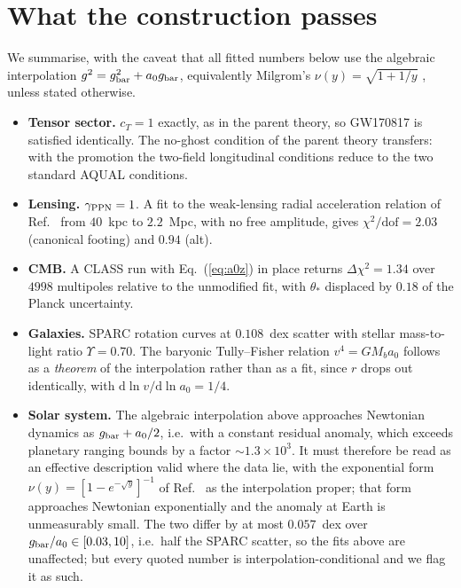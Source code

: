 \documentclass[aps,prd,twocolumn,superscriptaddress,nofootinbib,floatfix]{revtex4-2}
\newcommand{\azero}{a_{0}}
\begin{document}
\section{What the construction passes}

We summarise, with the caveat that all fitted numbers below use the algebraic interpolation
$g^{2} = g_{\rm bar}^{2} + \azero g_{\rm bar}$, equivalently Milgrom's $\nu(y) = \sqrt{1+1/y}$
\cite{Milgrom1999}, unless stated otherwise.

\begin{itemize}\itemsep2pt
\item \textbf{Tensor sector.} $c_{T} = 1$ exactly, as in the parent theory, so GW170817 is
      satisfied identically. The no-ghost condition of the parent theory transfers: with the
      promotion the two-field longitudinal conditions reduce to the two standard AQUAL
      conditions.
\item \textbf{Lensing.} $\gamma_{\rm PPN} = 1$. A fit to the weak-lensing radial acceleration
      relation of Ref.~\cite{Mistele2024} from $40$~kpc to $2.2$~Mpc, with no free amplitude,
      gives $\chi^{2}/\mathrm{dof} = 2.03$ (canonical footing) and $0.94$ (alt).
\item \textbf{CMB.} A CLASS run with Eq.~(\ref{eq:a0z}) in place returns $\Delta\chi^{2} = 1.34$
      over $4998$ multipoles relative to the unmodified fit, with $\theta_{*}$ displaced by
      $0.18$ of the Planck uncertainty.
\item \textbf{Galaxies.} SPARC rotation curves at $0.108$~dex scatter with stellar
      mass-to-light ratio $\Upsilon = 0.70$. The baryonic Tully--Fisher relation $v^{4} = G
      M_{b}\azero$ follows as a \emph{theorem} of the interpolation rather than as a fit, since
      $r$ drops out identically, with $\mathrm{d}\ln v/\mathrm{d}\ln \azero = 1/4$.
\item \textbf{Solar system.} The algebraic interpolation above approaches Newtonian dynamics as
      $g_{\rm bar} + \azero/2$, i.e.\ with a constant residual anomaly, which exceeds planetary
      ranging bounds by a factor $\sim 1.3\times10^{3}$. It must therefore be read as an
      effective description valid where the data lie, with the exponential form $\nu(y) = [1 -
      e^{-\sqrt{y}}]^{-1}$ of Ref.~\cite{McGaugh2016} as the interpolation proper; that form
      approaches Newtonian exponentially and the anomaly at Earth is unmeasurably small. The two
      differ by at most $0.057$~dex over $g_{\rm bar}/\azero \in [0.03,10]$, i.e.\ half the SPARC
      scatter, so the fits above are unaffected; but every quoted number is
      interpolation-conditional and we flag it as such.
\end{itemize}
\end{document}

